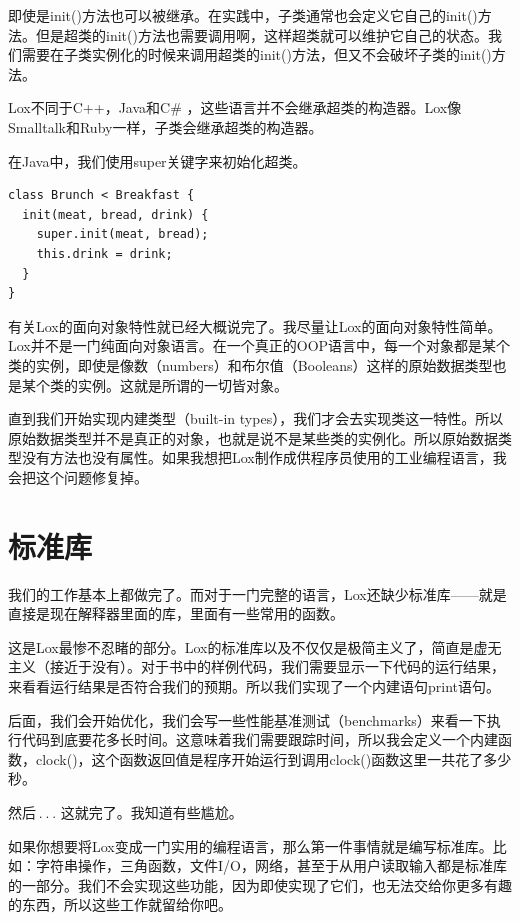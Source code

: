 \documentclass[cn,10pt,math=newtx,citestyle=gb7714-2015,bibstyle=gb7714-2015]{elegantbook}
\begin{document}
即使是init()方法也可以被继承。在实践中，子类通常也会定义它自己的init()方法。但是超类的init()方法也需要调用啊，这样超类就可以维护它自己的状态。我们需要在子类实例化的时候来调用超类的init()方法，但又不会破坏子类的init()方法。

\begin{tcolorbox}
Lox不同于C++，Java和C\# ，这些语言并不会继承超类的构造器。Lox像Smalltalk和Ruby一样，子类会继承超类的构造器。
\end{tcolorbox}

在Java中，我们使用super关键字来初始化超类。

\begin{verbatim}
class Brunch < Breakfast {
  init(meat, bread, drink) {
    super.init(meat, bread);
    this.drink = drink;
  }
}
\end{verbatim}

有关Lox的面向对象特性就已经大概说完了。我尽量让Lox的面向对象特性简单。Lox并不是一门纯面向对象语言。在一个真正的OOP语言中，每一个对象都是某个类的实例，即使是像数（numbers）和布尔值（Booleans）这样的原始数据类型也是某个类的实例。这就是所谓的一切皆对象。

直到我们开始实现内建类型（built-in types），我们才会去实现类这一特性。所以原始数据类型并不是真正的对象，也就是说不是某些类的实例化。所以原始数据类型没有方法也没有属性。如果我想把Lox制作成供程序员使用的工业编程语言，我会把这个问题修复掉。

\section{标准库}

我们的工作基本上都做完了。而对于一门完整的语言，Lox还缺少标准库——就是直接是现在解释器里面的库，里面有一些常用的函数。

这是Lox最惨不忍睹的部分。Lox的标准库以及不仅仅是极简主义了，简直是虚无主义（接近于没有）。对于书中的样例代码，我们需要显示一下代码的运行结果，来看看运行结果是否符合我们的预期。所以我们实现了一个内建语句print语句。

后面，我们会开始优化，我们会写一些性能基准测试（benchmarks）来看一下执行代码到底要花多长时间。这意味着我们需要跟踪时间，所以我会定义一个内建函数，clock()，这个函数返回值是程序开始运行到调用clock()函数这里一共花了多少秒。

然后 . . . 这就完了。我知道有些尴尬。

如果你想要将Lox变成一门实用的编程语言，那么第一件事情就是编写标准库。比如：字符串操作，三角函数，文件I/O，网络，甚至于从用户读取输入都是标准库的一部分。我们不会实现这些功能，因为即使实现了它们，也无法交给你更多有趣的东西，所以这些工作就留给你吧。
\end{document}
